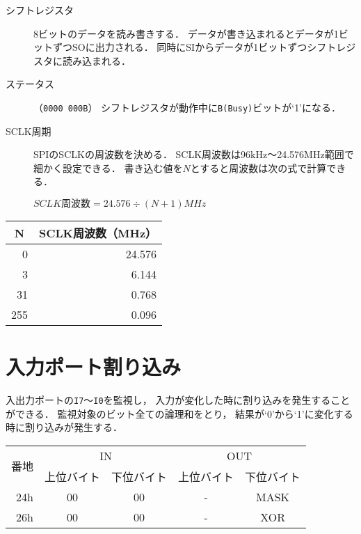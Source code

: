 \begin{description}
\item[シフトレジスタ]
  8ビットのデータを読み書きする．
  データが書き込まれるとデータが1ビットずつSOに出力される．
  同時にSIからデータが1ビットずつシフトレジスタに読み込まれる．
\item[ステータス]（\texttt{0000 000B}）
  シフトレジスタが動作中に\texttt{B(Busy)}ビットが`1'になる．
\item[SCLK周期]
  SPIのSCLKの周波数を決める．
  SCLK周波数は96kHz〜24.576MHz範囲で細かく設定できる．
  書き込む値を$N$とすると周波数は次の式で計算できる．

  \centerline{$SCLK周波数 = 24.576 \div ( N + 1 ) MHz$}
\end{description}

\begin{center}
  \small\begin{tabular}{ r | r }\hline\hline
  \multicolumn{1}{c|}{N} & \multicolumn{1}{|c}{SCLK周波数（MHz）} \\\hline
  0   & 24.576 \\
  3   &  6.144 \\
  31  &  0.768 \\
  255 &  0.096 \\
  \end{tabular}
\end{center}

\section{入力ポート割り込み}
入出力ポートの\texttt{I7}〜\texttt{I0}を監視し，
入力が変化した時に割り込みを発生することができる．
監視対象のビット全ての論理和をとり，
結果が`0'から`1'に変化する時に割り込みが発生する．

\begin{center}
  \small\begin{tabular}{| r | c | c || c | c |}\hline
    \multirow{2}{*}{番地}
    & \multicolumn{2}{|c||}{IN}
    & \multicolumn{2}{c|}{OUT}
    \\\cline{2-5}
         & 上位バイト & 下位バイト & 上位バイト & 下位バイト
    \\\hline\hline
    24h  &  00 & 00
         &  -  & MASK \\\hline
    26h  &  00 & 00
         &  -  & XOR \\\hline
  \end{tabular}
\end{center}

